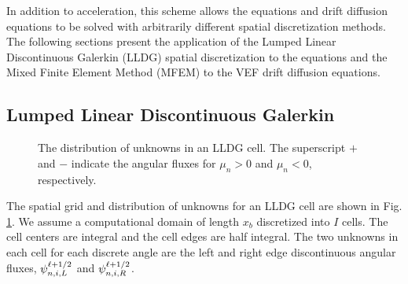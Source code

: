 In addition to acceleration, this scheme allows the \SN equations and drift diffusion equations to be solved with arbitrarily different spatial discretization methods. The following sections  present the application of the Lumped Linear Discontinuous Galerkin (LLDG) spatial discretization to the \SN equations and the Mixed Finite Element Method (MFEM) to the VEF drift diffusion equations. 

\subsection{Lumped Linear Discontinuous Galerkin \SN}
\begin{figure}
	\centering
	
	\caption{The distribution of unknowns in an LLDG cell. The superscript $+$ and $-$ indicate the angular fluxes for $\mu_n>0$ and $\mu_n<0$, respectively. } 
	\label{fig:lldg_grid}
\end{figure}
The spatial grid and distribution of unknowns for an LLDG cell are shown in Fig. \ref{fig:lldg_grid}. We assume a computational domain of length $x_b$ discretized into $I$ cells. The cell centers are integral and the cell edges are half integral. The two unknowns in each cell for each discrete angle are the left and right edge discontinuous angular fluxes, $\psi_{n,i,L}^{\ell+1/2}$ and $\psi_{n,i,R}^{\ell+1/2}$. 

